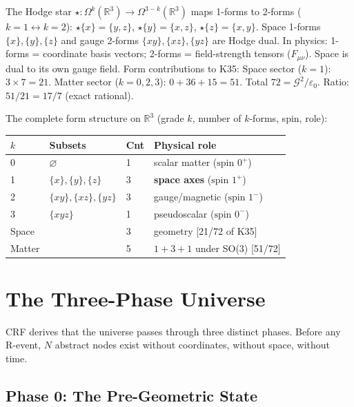 \documentclass[12pt, a4paper]{article}
\begin{document}
\begin{derivedbox}[title={Hodge Duality: Space 1-Forms $\leftrightarrow$ Gauge 2-Forms}]
The Hodge star $\star:\Omega^k(\mathbb{R}^3)\to\Omega^{3-k}(\mathbb{R}^3)$ maps 1-forms
to 2-forms ($k=1\leftrightarrow k=2$):
$\star\{x\}=\{y,z\}$, $\star\{y\}=\{x,z\}$, $\star\{z\}=\{x,y\}$.
Space 1-forms $\{x\},\{y\},\{z\}$ and gauge 2-forms $\{xy\},\{xz\},\{yz\}$ are Hodge dual.
In physics: 1-forms = coordinate basis vectors; 2-forms = field-strength tensors ($F_{\mu\nu}$).
Space is dual to its own gauge field. Form contributions to K35:
Space sector ($k=1$): $3\times 7=21$. Matter sector ($k=0,2,3$): $0+36+15=51$.
Total $72 = \mathcal{G}^2/\varepsilon_0$. Ratio: $51/21=17/7$ (exact rational).
\end{derivedbox}

The complete form structure on $\mathbb{R}^3$ (grade $k$, number of $k$-forms, spin, role):

\begin{center}
\renewcommand{\arraystretch}{1.2}
\begin{tabular}{p{1.5cm} p{3.5cm} p{0.8cm} p{5.0cm}}
\toprule
$k$ & \textbf{Subsets} & \textbf{Cnt} & \textbf{Physical role} \\
\midrule
0 & $\varnothing$ & 1 & scalar matter ($\text{spin }0^+$) \\
1 & $\{x\},\{y\},\{z\}$ & 3 & \textbf{space axes} ($\text{spin }1^+$) \\
2 & $\{xy\},\{xz\},\{yz\}$ & 3 & gauge/magnetic ($\text{spin }1^-$) \\
3 & $\{xyz\}$ & 1 & pseudoscalar ($\text{spin }0^-$) \\
\midrule
Space & & 3 & geometry [21/72 of K35] \\
Matter & & 5 & $1+3+1$ under SO(3) [51/72] \\
\bottomrule
\end{tabular}
\end{center}

\section{The Three-Phase Universe}

CRF derives that the universe passes through three distinct phases. Before any R-event,
$N$ abstract nodes exist without coordinates, without space, without time.

\subsection{Phase 0: The Pre-Geometric State}
\end{document}
